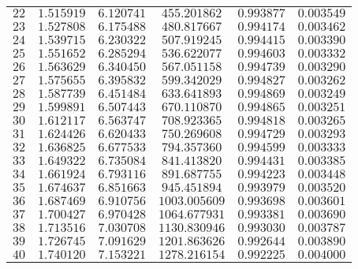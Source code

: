 \begin{tabular}{cccccc}
$22$    & $1.515919$ & $6.120741$ & $455.201862$  & $0.993877$ & $0.003549$ \\
$23$    & $1.527808$ & $6.175488$ & $480.817667$  & $0.994174$ & $0.003462$ \\
$24$    & $1.539715$ & $6.230322$ & $507.919245$  & $0.994415$ & $0.003390$ \\
$25$    & $1.551652$ & $6.285294$ & $536.622077$  & $0.994603$ & $0.003332$ \\
$26$    & $1.563629$ & $6.340450$ & $567.051158$  & $0.994739$ & $0.003290$ \\
$27$    & $1.575655$ & $6.395832$ & $599.342029$  & $0.994827$ & $0.003262$ \\
$28$    & $1.587739$ & $6.451484$ & $633.641893$  & $0.994869$ & $0.003249$ \\
$29$    & $1.599891$ & $6.507443$ & $670.110870$  & $0.994865$ & $0.003251$ \\
$30$    & $1.612117$ & $6.563747$ & $708.923365$  & $0.994818$ & $0.003265$ \\
$31$    & $1.624426$ & $6.620433$ & $750.269608$  & $0.994729$ & $0.003293$ \\
$32$    & $1.636825$ & $6.677533$ & $794.357360$  & $0.994599$ & $0.003333$ \\
$33$    & $1.649322$ & $6.735084$ & $841.413820$  & $0.994431$ & $0.003385$ \\
$34$    & $1.661924$ & $6.793116$ & $891.687755$  & $0.994223$ & $0.003448$ \\
$35$    & $1.674637$ & $6.851663$ & $945.451894$  & $0.993979$ & $0.003520$ \\
$36$    & $1.687469$ & $6.910756$ & $1003.005609$ & $0.993698$ & $0.003601$ \\
$37$    & $1.700427$ & $6.970428$ & $1064.677931$ & $0.993381$ & $0.003690$ \\
$38$    & $1.713516$ & $7.030708$ & $1130.830946$ & $0.993030$ & $0.003787$ \\
$39$    & $1.726745$ & $7.091629$ & $1201.863626$ & $0.992644$ & $0.003890$ \\
$40$    & $1.740120$ & $7.153221$ & $1278.216154$ & $0.992225$ & $0.004000$ \\\bottomrule
\end{tabular}
